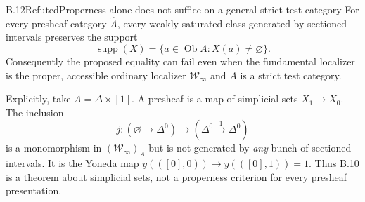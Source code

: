 \begin{claim}{B.12}{Refuted}{Properness alone does not suffice on a general strict test category}\label{B12}
For every presheaf category $\widehat A$, every weakly saturated class
generated by sectioned intervals preserves the support
\[
 \operatorname{supp}(X)=\{a\in\operatorname{Ob}A:X(a)\ne\varnothing\}.
\]
Consequently the proposed equality can fail even when the fundamental
localizer is the proper, accessible ordinary localizer $\mathcal W_\infty$
and $A$ is a strict test category.

Explicitly, take $A=\Delta\times[1]$.  A presheaf is a map of simplicial
sets $X_1\to X_0$.  The inclusion
\[
 j:(\varnothing\longrightarrow\Delta^0)
       \longrightarrow(\Delta^0\xrightarrow{1}\Delta^0)
\]
is a monomorphism in $(\mathcal W_\infty)_A$ but is not generated by
\emph{any} bunch of sectioned intervals.  It is the Yoneda map
$y(([0],0))\to y(([0],1))=1$.  Thus B.10 is a theorem about simplicial
sets, not a properness criterion for every presheaf presentation.
\end{claim}
